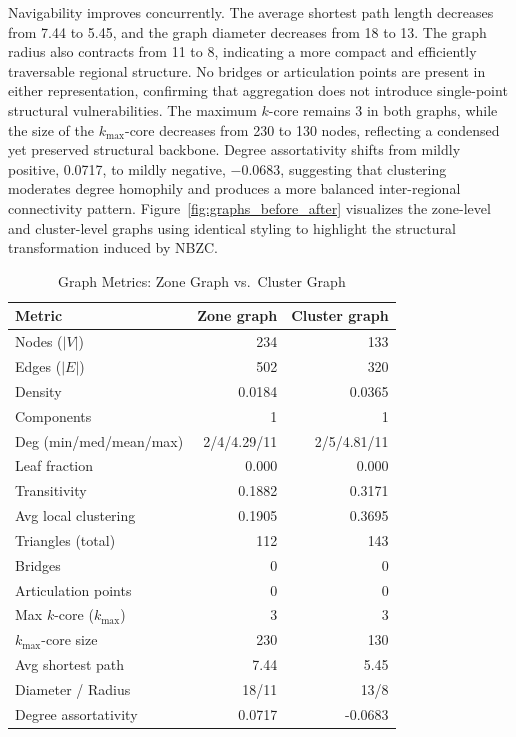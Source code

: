 \documentclass[conference]{IEEEtran}
\begin{document}
Navigability improves concurrently. The average shortest path length decreases
from 7.44 to 5.45, and the graph diameter decreases from 18 to 13. The graph
radius also contracts from 11 to 8, indicating a more compact and efficiently
traversable regional structure. No bridges or articulation points are present
in either representation, confirming that aggregation does not introduce
single-point structural vulnerabilities.
The maximum $k$-core remains 3 in both graphs, while the size of the
$k_{\max}$-core decreases from 230 to 130 nodes, reflecting a condensed yet
preserved structural backbone. Degree assortativity shifts from mildly positive, 0.0717, to mildly negative, $-0.0683$, suggesting that clustering moderates
degree homophily and produces a more balanced inter-regional connectivity
pattern.
Figure~\ref{fig:graphs_before_after} visualizes the zone-level and cluster-level
graphs using identical styling to highlight the structural transformation
induced by NBZC.
\begin{table}[t]
\centering
\caption{Graph Metrics: Zone Graph vs.\ Cluster Graph}
\label{tab:graph_metrics}
\scriptsize
\begin{tabular}{lrr}
\toprule
Metric & Zone graph & Cluster graph \\
\midrule
Nodes ($|V|$)         & 234   & 133 \\
Edges ($|E|$)         & 502   & 320 \\
Density               & 0.0184 & 0.0365 \\
Components            & 1     & 1 \\
Deg (min/med/mean/max) & 2/4/4.29/11 & 2/5/4.81/11 \\
Leaf fraction         & 0.000 & 0.000 \\
Transitivity          & 0.1882 & 0.3171 \\
Avg local clustering  & 0.1905 & 0.3695 \\
Triangles (total)     & 112   & 143 \\
Bridges               & 0     & 0 \\
Articulation points   & 0     & 0 \\
Max $k$-core ($k_{\max}$) & 3 & 3 \\
$k_{\max}$-core size  & 230   & 130 \\
Avg shortest path     & 7.44  & 5.45 \\
Diameter / Radius     & 18/11 & 13/8 \\
Degree assortativity  & 0.0717 & -0.0683 \\
\bottomrule
\end{tabular}
\end{table}
\end{document}
